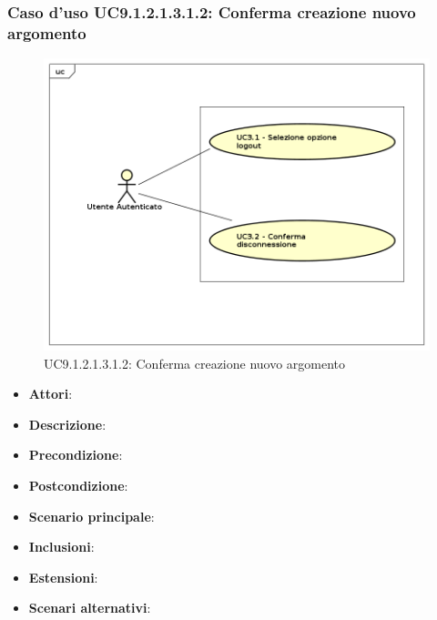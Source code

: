 							\subsubsection{Caso d'uso UC9.1.2.1.3.1.2: Conferma creazione nuovo argomento}
							\label{UC9.1.2.1.3.1.2}
							\begin{figure}[h]
								\centering
								\includegraphics[scale=0.7,keepaspectratio]{UML/UC9.png}
								\caption{UC9.1.2.1.3.1.2: Conferma creazione nuovo argomento}
							\end{figure}
							\FloatBarrier
							\begin{itemize}
								\item \textbf{Attori}: 
								\item \textbf{Descrizione}: 
								\item \textbf{Precondizione}: 
								\item \textbf{Postcondizione}: 
								\item \textbf{Scenario principale}:
								\item \textbf{Inclusioni}:
								\item \textbf{Estensioni}:
								\item \textbf{Scenari alternativi}:
							\end{itemize}
						

